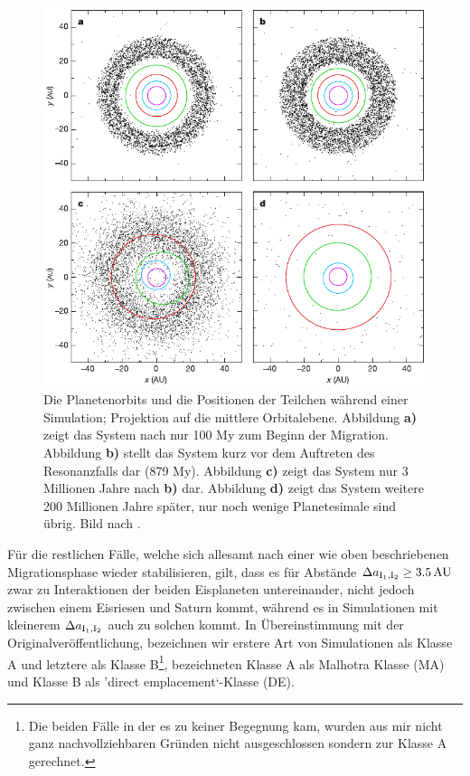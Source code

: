 \documentclass[12pt,a4paper,twoside,open=right,bibliography=totoc]{scrbook}
\renewcommand{\cite}{ \citep}
\begin{document}
\begin{figure}[tbn]
\centering
\includegraphics[scale=1]{img/Gomes2005-2.pdf}
\caption{Die Planetenorbits und die Positionen der Teilchen während einer Simulation; Projektion auf die mittlere Orbitalebene. Abbildung \textbf{a)} zeigt das System nach nur 100 My zum Beginn der Migration. Abbildung \textbf{b)} stellt das System kurz vor dem Auftreten des Resonanzfalls dar (879 My). Abbildung \textbf{c)} zeigt das System nur 3 Millionen Jahre nach \textbf{b)} dar. Abbildung \textbf{d)} zeigt das System weitere 200 Millionen Jahre später, nur noch wenige Planetesimale sind übrig. Bild nach \cite{Gomes2005}.}
\label{fig:Zeitlicheentwicklung}
\end{figure}
Für die restlichen Fälle, welche sich allesamt nach einer wie oben beschriebenen Migrationsphase wieder stabilisieren, gilt, dass es für Abstände $\DII \ge \unit[3.5]{AU}$ zwar zu Interaktionen der beiden Eisplaneten untereinander, nicht jedoch zwischen einem Eisriesen und Saturn kommt, während es in Simulationen mit kleinerem $\Delta a_{\mathrm{I}_1,\mathrm{I}_2}$ auch zu solchen kommt. In Übereinstimmung mit der Originalveröffentlichung, bezeichnen wir erstere Art von Simulationen als Klasse A und letztere als Klasse B\footnote{Die beiden Fälle in der es zu keiner Begegnung kam, wurden aus mir nicht ganz nachvollziehbaren Gründen nicht ausgeschlossen sondern zur Klasse A gerechnet.}, \cite{Nesvorny2007} bezeichneten Klasse A als Malhotra Klasse (MA) \citep[nach][]{Malhotra1996,Hahn1999a} und Klasse B als 'direct emplacement`-Klasse (DE).
\end{document}
